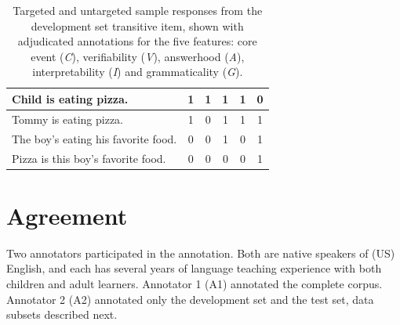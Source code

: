 \documentclass[11pt,a4paper]{article}
\begin{document}
\begin{table}[htb!]
\begin{center}
\begin{tabular}{|p{3.7cm}|c|c|c|c|c|}
\hline
\hline
Child is eating pizza. & 1 & 1 & 1 & 1 & 0 \\
\hline
Tommy is eating pizza. & 1 & 0 & 1 & 1 & 1 \\
\hline
The boy's eating his favorite food. & 0 & 0 & 1 & 0 & 1 \\
\hline
Pizza is this boy's favorite food. & 0 & 0 & 0 & 0 & 1 \\
\hline
\end{tabular}
\caption{\label{tab:devo-transitive} Targeted and untargeted sample responses from the development set transitive item, shown with adjudicated annotations for the five features: core event (\textit{C}), verifiability (\textit{V}), answerhood (\textit{A}), interpretability (\textit{I}) and grammaticality (\textit{G}).}
\end{center}
\end{table}

\section{Agreement}
\label{sec:agreement}
Two annotators participated in the annotation. Both are native speakers of (US) English, and each has several years of language teaching experience with both children and adult learners. Annotator 1 (A1) annotated the complete corpus. Annotator 2 (A2) annotated only the development set and the test set, data subsets described next.
\end{document}
